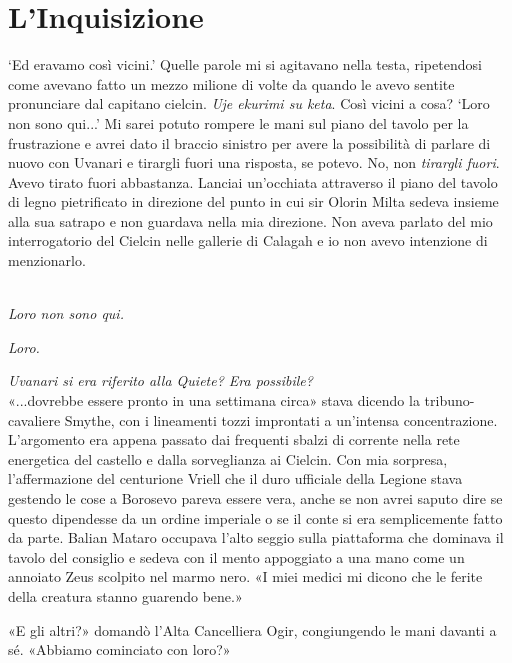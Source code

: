 \chapter{L'Inquisizione}

`Ed eravamo così vicini.' Quelle parole mi si agitavano nella testa,
ripetendosi come avevano fatto un mezzo milione di volte da quando le
avevo sentite pronunciare dal capitano cielcin. \emph{Uje ekurimi su
	keta}. Così vicini a cosa? `Loro non sono qui...' Mi sarei potuto
rompere le mani sul piano del tavolo per la frustrazione e avrei dato il
braccio sinistro per avere la possibilità di parlare di nuovo con
Uvanari e tirargli fuori una risposta, se potevo. No, non \emph{tirargli
	fuori}. Avevo tirato fuori abbastanza. Lanciai un'occhiata attraverso il
piano del tavolo di legno pietrificato in direzione del punto in cui sir
Olorin Milta sedeva insieme alla sua satrapo e non guardava nella mia
direzione. Non aveva parlato del mio interrogatorio del Cielcin nelle
gallerie di Calagah e io non avevo intenzione di menzionarlo.

\leavevmode\\
\emph{Loro non sono qui.}

\emph{Loro.}

\emph{Uvanari si era riferito alla Quiete? Era possibile?}
\leavevmode\\

«...dovrebbe essere pronto in una settimana circa» stava dicendo la
tribuno-cavaliere Smythe, con i lineamenti tozzi improntati a un'intensa
concentrazione. L'argomento era appena passato dai frequenti sbalzi di
corrente nella rete energetica del castello e dalla sorveglianza ai
Cielcin. Con mia sorpresa, l'affermazione del centurione Vriell che il
duro ufficiale della Legione stava gestendo le cose a Borosevo pareva
essere vera, anche se non avrei saputo dire se questo dipendesse da un
ordine imperiale o se il conte si era semplicemente fatto da parte.
Balian Mataro occupava l'alto seggio sulla piattaforma che dominava il
tavolo del consiglio e sedeva con il mento appoggiato a una mano come un
annoiato Zeus scolpito nel marmo nero. «I miei medici mi dicono che le
ferite della creatura stanno guarendo bene.»

«E gli altri?» domandò l'Alta Cancelliera Ogir, congiungendo le mani
davanti a sé. «Abbiamo cominciato con loro?»

